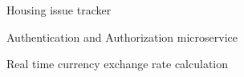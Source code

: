 
\vspace{-5mm}
\begin{cventries}

\cventry
  {} %
  {} %
  {} %
  {} %
  {
    \begin{cvitems} %
      \item Housing issue tracker
      \item Authentication and Authorization microservice
      \item Real time currency exchange rate calculation
    \end{cvitems}
  }

\end{cventries}
